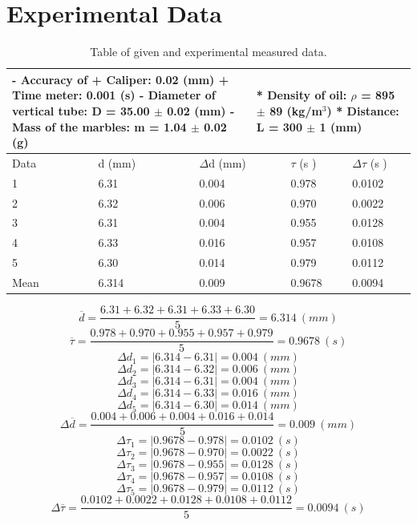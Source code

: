 \section{Experimental Data}
\begin{table}[h!]
\centering
\begin{tabular}{|p{0.8in}|p{0.9in}|p{0.5in}|p{0.4in}|p{0.9in}|p{0.9in}|} 
\hline 
\multicolumn{3}{|p{3in}|}{
- Accuracy of\newline
+ Caliper: 0.02 (mm) \newline
+ Time meter: 0.001 (s)\newline
- Diameter of vertical tube: \newline
D = 35.00 ${\pm}$ 0.02 (mm)\newline 
- Mass of the marbles: m = 1.04 ${\pm}$ 0.02 (g)
} & \multicolumn{3}{|p{2.3in}|}{
* Density of oil: $\rho $ = 895 ${\pm}$ 89 (kg/m${}^{3}$)  \newline
* Distance: L = 300 ${\pm}$ 1 (mm)
} \\ \hline 
Data & d (mm) & \multicolumn{2}{|p{0.9in}|}{ $\Delta$d (mm)} & $\tau$ (s ) & $\Delta$$\tau$  (s ) \\ \hline 
1 & 6.31 & \multicolumn{2}{|p{0.9in}|}{0.004} & 0.978 & 0.0102 \\ \hline 
2 & 6.32 & \multicolumn{2}{|p{0.9in}|}{0.006} & 0.970 & 0.0022 \\ \hline 
3 & 6.31 & \multicolumn{2}{|p{0.9in}|}{0.004} & 0.955 & 0.0128 \\ \hline 
4 & 6.33 & \multicolumn{2}{|p{0.9in}|}{0.016} & 0.957 & 0.0108 \\ \hline 
5 & 6.30 & \multicolumn{2}{|p{0.9in}|}{0.014} & 0.979 & 0.0112 \\ \hline 
Mean & 6.314 & \multicolumn{2}{|p{0.9in}|}{0.009} & 0.9678 & 0.0094 \\ \hline 
\end{tabular}
\caption{Table of given and experimental measured data.}
\label{table:1}
\end{table}

\[\overline{d} = \frac{6.31 + 6.32 + 6.31 + 6.33 + 6.30}{5} = 6.314\ (mm)\] 
\[\overline{\tau} = \frac{0.978 + 0.970 + 0.955 + 0.957 + 0.979}{5} = 0.9678\ (s)\] 
\[\Delta d_1 = |6.314 - 6.31| = 0.004\ (mm)\]
\[\Delta d_2 = |6.314 - 6.32| = 0.006\ (mm)\]
\[\Delta d_3 = |6.314 - 6.31| = 0.004\ (mm)\]
\[\Delta d_4 = |6.314 - 6.33| = 0.016\ (mm)\]
\[\Delta d_5 = |6.314 - 6.30| = 0.014\ (mm)\]
\[\Delta \overline{d} = \frac{0.004 + 0.006 + 0.004 + 0.016 + 0.014}{5} = 0.009\ (mm)\] 
\[\Delta \tau_1 = |0.9678 - 0.978| = 0.0102\ (s)\]
\[\Delta \tau_2 = |0.9678 - 0.970| = 0.0022\ (s)\]
\[\Delta \tau_3 = |0.9678 - 0.955| = 0.0128\ (s)\]
\[\Delta \tau_4 = |0.9678 - 0.957| = 0.0108\ (s)\]
\[\Delta \tau_5 = |0.9678 - 0.979| = 0.0112\ (s)\]
\[\Delta \overline{\tau} = \frac{0.0102 + 0.0022 + 0.0128 + 0.0108 + 0.0112}{5} = 0.0094\ (s)\] 
\newpage

